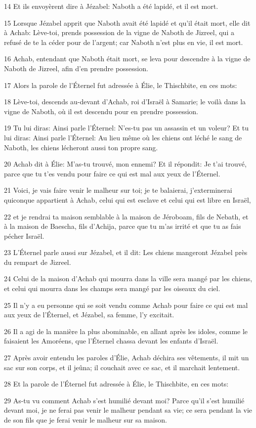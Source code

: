 \par 14 Et ils envoyèrent dire à Jézabel: Naboth a été lapidé, et il est mort.
\par 15 Lorsque Jézabel apprit que Naboth avait été lapidé et qu'il était mort, elle dit à Achab: Lève-toi, prends possession de la vigne de Naboth de Jizreel, qui a refusé de te la céder pour de l'argent; car Naboth n'est plus en vie, il est mort.
\par 16 Achab, entendant que Naboth était mort, se leva pour descendre à la vigne de Naboth de Jizreel, afin d'en prendre possession.
\par 17 Alors la parole de l'Éternel fut adressée à Élie, le Thischbite, en ces mots:
\par 18 Lève-toi, descends au-devant d'Achab, roi d'Israël à Samarie; le voilà dans la vigne de Naboth, où il est descendu pour en prendre possession.
\par 19 Tu lui diras: Ainsi parle l'Éternel: N'es-tu pas un assassin et un voleur? Et tu lui diras: Ainsi parle l'Éternel: Au lieu même où les chiens ont léché le sang de Naboth, les chiens lécheront aussi ton propre sang.
\par 20 Achab dit à Élie: M'as-tu trouvé, mon ennemi? Et il répondit: Je t'ai trouvé, parce que tu t'es vendu pour faire ce qui est mal aux yeux de l'Éternel.
\par 21 Voici, je vais faire venir le malheur sur toi; je te balaierai, j'exterminerai quiconque appartient à Achab, celui qui est esclave et celui qui est libre en Israël,
\par 22 et je rendrai ta maison semblable à la maison de Jéroboam, fils de Nebath, et à la maison de Baescha, fils d'Achija, parce que tu m'as irrité et que tu as fais pécher Israël.
\par 23 L'Éternel parle aussi sur Jézabel, et il dit: Les chiens mangeront Jézabel près du rempart de Jizreel.
\par 24 Celui de la maison d'Achab qui mourra dans la ville sera mangé par les chiens, et celui qui mourra dans les champs sera mangé par les oiseaux du ciel.
\par 25 Il n'y a eu personne qui se soit vendu comme Achab pour faire ce qui est mal aux yeux de l'Éternel, et Jézabel, sa femme, l'y excitait.
\par 26 Il a agi de la manière la plus abominable, en allant après les idoles, comme le faisaient les Amoréens, que l'Éternel chassa devant les enfants d'Israël.
\par 27 Après avoir entendu les paroles d'Élie, Achab déchira ses vêtements, il mit un sac sur son corps, et il jeûna; il couchait avec ce sac, et il marchait lentement.
\par 28 Et la parole de l'Éternel fut adressée à Élie, le Thischbite, en ces mots:
\par 29 As-tu vu comment Achab s'est humilié devant moi? Parce qu'il s'est humilié devant moi, je ne ferai pas venir le malheur pendant sa vie; ce sera pendant la vie de son fils que je ferai venir le malheur sur sa maison.

